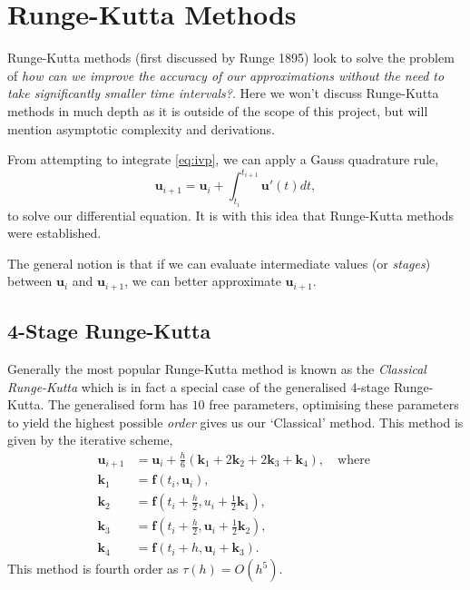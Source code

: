 \documentclass[12pt, twoside]{report}
\theoremstyle{plain}
\theoremstyle{definition}
\theoremstyle{definition}
\begin{document}
    \section{Runge-Kutta Methods}
    \label{2_runge_kutta}
        Runge-Kutta methods (first discussed by Runge 1895) look to solve the 
        problem of \textit{how can we improve the accuracy of our 
        approximations without the need to take significantly smaller time 
        intervals?}. Here we won't discuss Runge-Kutta methods in much depth 
        as it is outside of the scope of this project, but will mention 
        asymptotic complexity and derivations.

        From attempting to integrate \eqref{eq:ivp}, we can apply a Gauss quadrature rule,
        \begin{equation}
        \label{eq:fundamental_theorem_calculus}
            \mathbf{u}_{i+1} = \mathbf{u}_i + \int_{t_i}^{t_{i+1}} 
            \mathbf{u}'(t) dt,
        \end{equation}
        to solve our differential equation. It is with this idea that Runge-Kutta methods were established.

        The general notion is that if we can evaluate intermediate values 
        (or \textit{stages}) between $\mathbf{u}_i$ and $\mathbf{u}_{i+1}$, we can better approximate $\mathbf{u}_{i+1}$. 

        \subsection{4-Stage Runge-Kutta}
        \label{2_rk4}
            Generally the most popular Runge-Kutta method is known as the 
            \textit{Classical Runge-Kutta} which is in fact a special case of 
            the generalised 4-stage Runge-Kutta. The generalised form has $10$
            free parameters, optimising these parameters to yield the highest 
            possible \textit{order} gives us our `Classical' method. This 
            method is given by the iterative scheme,
            \begin{equation}
            \label{eq:rk4}
                \begin{split}
                    \mathbf{u}_{i+1} &= \mathbf{u}_i + 
                    \frac{h}{6} (\mathbf{k}_1 + 2\mathbf{k}_2 + 2\mathbf{k}_3 
                    + \mathbf{k}_4), \quad 
                    \text{where }\\
                    \mathbf{k}_1 &= \mathbf{f}(t_i, \mathbf{u}_i),\\
                    \mathbf{k}_2 &= \mathbf{f}(t_i+\frac{h}{2}, 
                    u_i+\frac{1}{2}\mathbf{k}_1),\\
                    \mathbf{k}_3 &= \mathbf{f}(t_i+\frac{h}{2}, 
                    \mathbf{u}_i+\frac{1}{2}\mathbf{k}_2),\\
                    \mathbf{k}_4 &= \mathbf{f}(t_i+h, 
                    \mathbf{u}_i+\mathbf{k}_3).
                \end{split}
            \end{equation}
            This method is fourth order as $\tau(h)=O(h^5)$. 
\end{document}
